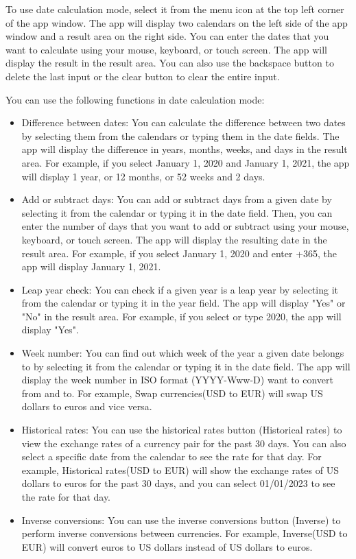 \documentclass[12pt]{article}
\begin{document}
To use date calculation mode, select it from the menu icon at the top left corner of the app window. The app will display two calendars on the left side of the app window and a result area on the right side. You can enter the dates that you want to calculate using your mouse, keyboard, or touch screen. The app will display the result in the result area. You can also use the backspace button to delete the last input or the clear button to clear the entire input.

You can use the following functions in date calculation mode\cite{calculator-how-to-use}:

\begin{itemize}
    \item Difference between dates: You can calculate the difference between two dates by selecting them from the calendars or typing them in the date fields. The app will display the difference in years, months, weeks, and days in the result area. For example, if you select January 1, 2020 and January 1, 2021, the app will display 1 year, or 12 months, or 52 weeks and 2 days.
    \item Add or subtract days: You can add or subtract days from a given date by selecting it from the calendar or typing it in the date field. Then, you can enter the number of days that you want to add or subtract using your mouse, keyboard, or touch screen. The app will display the resulting date in the result area. For example, if you select January 1, 2020 and enter +365, the app will display January 1, 2021.
    \item Leap year check: You can check if a given year is a leap year by selecting it from the calendar or typing it in the year field. The app will display "Yes" or "No" in the result area. For example, if you select or type 2020, the app will display "Yes".
    \item Week number: You can find out which week of the year a given date belongs to by selecting it from the calendar or typing it in the date field. The app will display the week number in ISO format (YYYY-Www-D)    want to convert from and to. For example, Swap currencies(USD to EUR) will swap US dollars to euros and vice versa.
    \item Historical rates: You can use the historical rates button (Historical rates) to view the exchange rates of a currency pair for the past 30 days. You can also select a specific date from the calendar to see the rate for that day. For example, Historical rates(USD to EUR) will show the exchange rates of US dollars to euros for the past 30 days, and you can select 01/01/2023 to see the rate for that day.
    \item Inverse conversions: You can use the inverse conversions button (Inverse) to perform inverse conversions between currencies. For example, Inverse(USD to EUR) will convert euros to US dollars instead of US dollars to euros.
\end{itemize}
\end{document}
